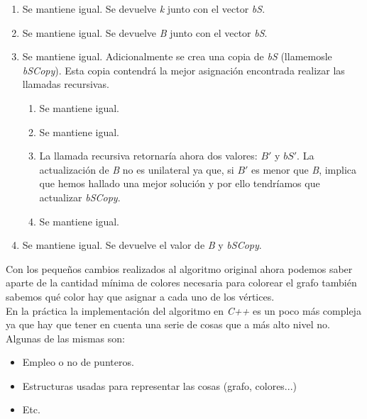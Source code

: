 \documentclass[british,a4paper,11pt,titlepage]{article}
\begin{document}
    \begin{enumerate}
        \item Se mantiene igual. Se devuelve \textit{k} junto con el vector \textit{bS}.
        \item Se mantiene igual. Se devuelve \textit{B} junto con el vector \textit{bS}.
        \item Se mantiene igual. Adicionalmente se crea una copia de \textit{bS} (llamemosle \textit{bSCopy}). Esta copia contendrá la mejor asignación encontrada realizar las llamadas recursivas.
        \begin{enumerate}
            \item Se mantiene igual.
            \item Se mantiene igual.
            \item La llamada recursiva retornaría ahora dos valores: $B'$ y $bS'$. La actualización de \textit{B} no es unilateral ya que, si $B'$ es menor que \textit{B}, implica que hemos hallado una mejor solución y por ello tendríamos que actualizar \textit{bSCopy}.
            \item Se mantiene igual.
        \end{enumerate}
        \item Se mantiene igual. Se devuelve el valor de \textit{B} y \textit{bSCopy}.
    \end{enumerate}

    Con los pequeños cambios realizados al algoritmo original ahora podemos saber aparte de la cantidad mínima de colores necesaria para colorear el grafo también sabemos qué color hay que asignar a cada uno de los vértices.
    \\
    En la práctica la implementación del algoritmo en \emph{C++} es un poco más compleja ya que hay que tener en cuenta una serie de cosas que a más alto nivel no. Algunas de las mismas son:
    \begin{itemize}
        \item Empleo o no de punteros.
        \item Estructuras usadas para representar las cosas (grafo, colores...)
        \item Etc.
    \end{itemize}
\end{document}
